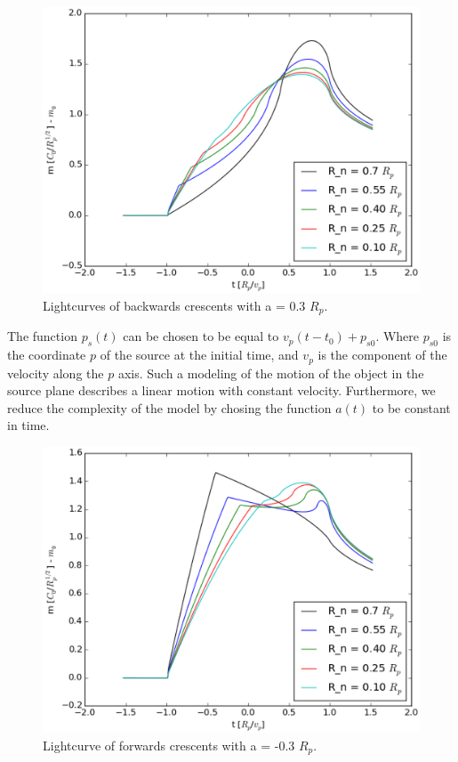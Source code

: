 \begin{figure}
\includegraphics[width = .8\textwidth]{plots/4rn_magnification.eps}
\caption{\label{fig:lightcurve_crescent_back} Lightcurves of backwards crescents with  a = 0.3 $R_p$.}
\end{figure}

The function $p_s(t)$ can be chosen to be equal to $v_p(t-t_0) + p_{s0}$. Where $p_{s0}$ is the coordinate $p$ of the source at the initial time, and $v_p$ is the component of the velocity
along the $p$ axis. Such a modeling of the motion of the object in the source plane describes a linear motion with constant velocity. Furthermore, we reduce the complexity of the model by 
chosing the function $a(t)$ to be constant in time.  

\begin{figure}
\includegraphics[width = .8\textwidth]{plots/4rn2_magnification.eps}
\caption{\label{fig:lightcurve_crescent} Lightcurve of forwards crescents with a = -0.3 $R_p$.}
\end{figure}

